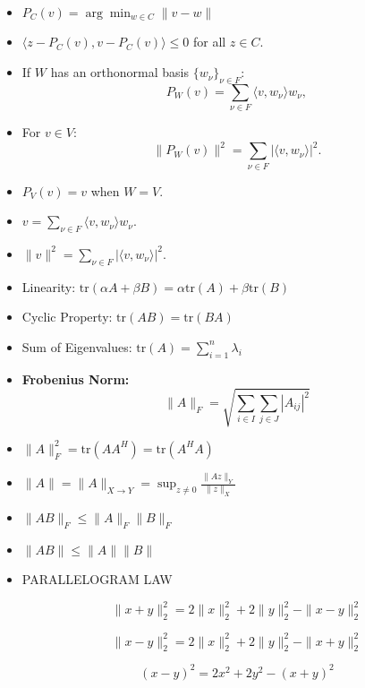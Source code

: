 \documentclass{article}
\begin{document}
\begin{itemize}
\item $P_C(v) = \arg \min_{w \in C} \|v - w\|$

\item $\langle z - P_C(v), v - P_C(v) \rangle \leq 0$ for all $z \in C$.

 \item If \( W \) has an orthonormal basis \( \{ w_\nu \}_{\nu \in F} \):
    \[
    P_W(v) = \sum_{\nu \in F} \langle v, w_\nu \rangle w_\nu,
    \]

 \item For \( v \in V \):
    \[
    \| P_W(v) \|^2 = \sum_{\nu \in F} |\langle v, w_\nu \rangle|^2.
    \]

 \item $P_V(v) = v$ when $W = V$.

 \item $v = \sum_{\nu \in F} \langle v, w_\nu \rangle w_\nu$.

 \item $\| v \|^2 = \sum_{\nu \in F} |\langle v, w_\nu \rangle|^2$.

 \item Linearity: $\text{tr}(\alpha A + \beta B) = \alpha \text{tr}(A) + \beta \text{tr}(B)$
    \item Cyclic Property: $\text{tr}(AB) = \text{tr}(BA)$
    \item Sum of Eigenvalues: $\text{tr}(A) = \sum_{i=1}^{n} \lambda_i$
 
\item \textbf{Frobenius Norm:}
    \[
    \| A \|_F = \sqrt{\sum_{i \in I} \sum_{j \in J} |A_{ij}|^2}
    \]

 \item 
    $
    \| A \|_F^2 = \text{tr}(AA^H) = \text{tr}(A^H A)
   $

\item 
$
\|A\| = \|A\|_{X \rightarrow Y} = \sup_{z \neq 0} \frac{\|Az\|_Y}{\|z\|_X}
$

\item 
$
\|AB\|_F \leq \|A\|_F \|B\|_F
$

\item $
\|AB\| \leq \|A\| \|B\|
$


\item PARALLELOGRAM LAW

\[
\|x + y\|^2_2 = 2 \|x\|^2_2 + 2 \|y\|^2_2 - \|x - y\|^2_2
\]

\[
\|x - y\|^2_2 = 2 \|x\|^2_2 + 2 \|y\|^2_2 - \|x + y\|^2_2
\]

\[
(x - y)^2 = 2x^2 + 2y^2 - (x + y)^2
\]


\end{itemize}
\end{document}
